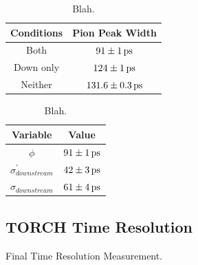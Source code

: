 \begin{table}[h]
\centering
\begin{tabular}{|c|c|}
\hline
Conditions & Pion Peak Width \\ \hline
Both & $91\pm1\,\rm{ps}$ \\
Down only & $124\pm1\,\rm{ps}$ \\
Neither & $131.6\pm0.3\,\rm{ps}$ \\ \hline
\end{tabular}
\caption{Blah.}
\label{tab:TORCH_TimeRefRes_PeakWidths}
\end{table}


\begin{table}[h]
\centering
\begin{tabular}{|c|c|}
\hline
Variable & Value \\ \hline
$\phi$ & $91\pm1\,\rm{ps}$ \\
$\sigma_{downstream}^{\prime}$ & $42 \pm 3 \,\rm{ps}$ \\
$\sigma_{downstream}$ & $61 \pm 4 \,\rm{ps}$ \\ \hline
\end{tabular}
\caption{Blah.}
\label{tab:TORCH_TimeRefRes_Results}
\end{table}


\subsection{TORCH Time Resolution}
Final Time Resolution Measurement.

